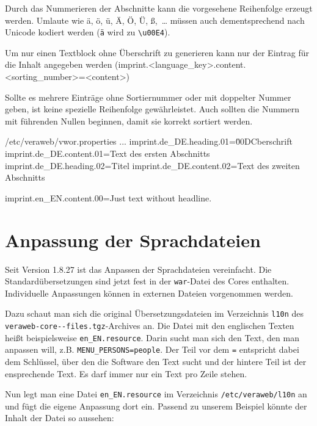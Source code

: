 Durch das Nummerieren der Abschnitte kann die vorgesehene Reihenfolge erzeugt werden.
Umlaute wie ä, ö, ü, Ä, Ö, Ü, ß,~… müssen auch dementsprechend nach Unicode kodiert
werden (\texttt{ä} wird zu \texttt{\textbackslash{}u00E4}).

Um nur einen Textblock ohne Überschrift zu generieren kann nur der Eintrag
für die Inhalt angegeben werden (imprint.<language\_key>.content.<sorting\_number>=<content>)

Sollte es mehrere Einträge ohne Sortiernummer oder mit doppelter Nummer geben,
ist keine spezielle Reihenfolge gewährleistet. Auch sollten die Nummern mit
führenden Nullen beginnen, damit sie korrekt sortiert werden.

\begin{minipage}{\linewidth}
\begin{lstdump}{/etc/veraweb/vwor.properties}
...
imprint.de_DE.heading.01=\u00DCberschrift
imprint.de_DE.content.01=Text des ersten Abschnitts
imprint.de_DE.heading.02=Titel
imprint.de_DE.content.02=Text des zweiten Abschnitts

imprint.en_EN.content.00=Just text without headline.
\end{lstdump}
\end{minipage}

\fi%

\iffalse%
\section{Anpassung der Sprachdateien}\label{sec:l10n}

Seit Version 1.8.27 ist das Anpassen der Sprachdateien vereinfacht.
Die Standardübersetzungen sind jetzt fest in der \texttt{war}-Datei
des Cores enthalten. Individuelle Anpassungen können in
externen Dateien vorgenommen werden.

Dazu schaut man sich die original Übersetzungsdateien im Verzeichnis
\texttt{l10n} des \texttt{veraweb-core-\vwiaverssw{}-files.tgz}-Archives
an. Die Datei mit den englischen Texten heißt beispielsweise
\texttt{en\_EN.resource}. Darin sucht man sich den Text, den man
anpassen will, z.B. \texttt{MENU\_PERSONS=people}. Der Teil vor dem
\texttt{=} entspricht dabei dem Schlüssel, über den die Software den
Text sucht und der hintere Teil ist der ensprechende Text. Es darf
immer nur ein Text pro Zeile stehen.

Nun legt man eine Datei \texttt{en\_EN.resource} im Verzeichnis
\texttt{/etc/veraweb/l10n} an und fügt die eigene Anpassung dort ein.
Passend zu unserem Beispiel könnte der Inhalt der Datei so aussehen:

